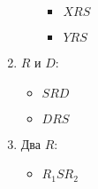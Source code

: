 \begin{enumerate}
\begin{enumerate}
\begin{itemize}
			\item $XRS$
			\item $YRS$
		\end{itemize}
	\end{enumerate}
	\item $R$ и $D$:
	\begin{itemize}
			\item $SRD$
			\item $DRS$
	\end{itemize}
	\item Два $R$:
	\begin{itemize}
			\item $R_1SR_2$
	\end{itemize}
\end{enumerate}

